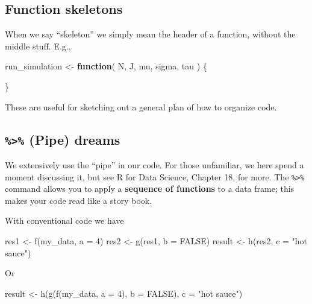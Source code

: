 \documentclass[
]{book}
\newenvironment{Shaded}{\begin{snugshade}}{\end{snugshade}}
\newcommand{\AttributeTok}[1]{\textcolor[rgb]{0.77,0.63,0.00}{#1}}
\newcommand{\ConstantTok}[1]{\textcolor[rgb]{0.00,0.00,0.00}{#1}}
\newcommand{\ControlFlowTok}[1]{\textcolor[rgb]{0.13,0.29,0.53}{\textbf{#1}}}
\newcommand{\DecValTok}[1]{\textcolor[rgb]{0.00,0.00,0.81}{#1}}
\newcommand{\FunctionTok}[1]{\textcolor[rgb]{0.00,0.00,0.00}{#1}}
\newcommand{\NormalTok}[1]{#1}
\newcommand{\OtherTok}[1]{\textcolor[rgb]{0.56,0.35,0.01}{#1}}
\newcommand{\StringTok}[1]{\textcolor[rgb]{0.31,0.60,0.02}{#1}}
\begin{document}
\hypertarget{function-skeletons}{%
\subsection{Function skeletons}\label{function-skeletons}}

When we say ``skeleton'' we simply mean the header of a function, without the middle stuff. E.g.,

\begin{Shaded}
\begin{Highlighting}[]
\NormalTok{run\_simulation }\OtherTok{\textless{}{-}} \ControlFlowTok{function}\NormalTok{( N, J, mu, sigma, tau ) \{}
  
\NormalTok{\}}
\end{Highlighting}
\end{Shaded}

These are useful for sketching out a general plan of how to organize code.

\hypertarget{pipe-dreams}{%
\subsection{\texorpdfstring{\texttt{\%\textgreater{}\%} (Pipe) dreams}{\%\textgreater\% (Pipe) dreams}}\label{pipe-dreams}}

We extensively use the ``pipe'' in our code.
For those unfamiliar, we here spend a moment discussing it, but see R for Data Science, Chapter 18, for more.
The \texttt{\%\textgreater{}\%} command allows you to apply a \textbf{sequence of functions} to a data frame; this makes your code read like a story book.

With conventional code we have

\begin{Shaded}
\begin{Highlighting}[]
\NormalTok{res1 }\OtherTok{\textless{}{-}} \FunctionTok{f}\NormalTok{(my\_data, }\AttributeTok{a =} \DecValTok{4}\NormalTok{)}
\NormalTok{res2 }\OtherTok{\textless{}{-}} \FunctionTok{g}\NormalTok{(res1, }\AttributeTok{b =} \ConstantTok{FALSE}\NormalTok{)}
\NormalTok{result }\OtherTok{\textless{}{-}} \FunctionTok{h}\NormalTok{(res2, }\AttributeTok{c =} \StringTok{"hot sauce"}\NormalTok{)}
\end{Highlighting}
\end{Shaded}

Or

\begin{Shaded}
\begin{Highlighting}[]
\NormalTok{result }\OtherTok{\textless{}{-}} \FunctionTok{h}\NormalTok{(}\FunctionTok{g}\NormalTok{(}\FunctionTok{f}\NormalTok{(my\_data, }\AttributeTok{a =} \DecValTok{4}\NormalTok{), }
              \AttributeTok{b =} \ConstantTok{FALSE}\NormalTok{), }
            \AttributeTok{c =} \StringTok{"hot sauce"}\NormalTok{)}
\end{Highlighting}
\end{Shaded}
\end{document}
